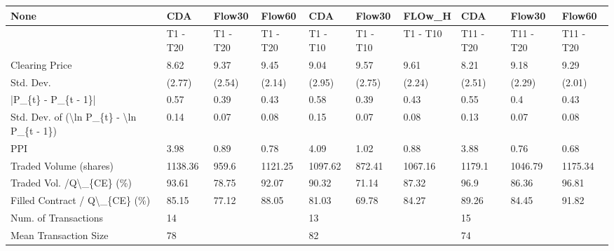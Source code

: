 \begin{tabular}{llllllllll}
\hline
 None                                                      & CDA      & Flow30   & Flow60   & CDA      & Flow30   & FLOw\_H   & CDA       & Flow30    & Flow60    \\
\hline
                                                           & T1 - T20 & T1 - T20 & T1 - T20 & T1 - T10 & T1 - T10 & T1 - T10 & T11 - T20 & T11 - T20 & T11 - T20 \\
 Clearing Price                                            & 8.62     & 9.37     & 9.45     & 9.04     & 9.57     & 9.61     & 8.21      & 9.18      & 9.29      \\
 Std. Dev.                                                 & (2.77)   & (2.54)   & (2.14)   & (2.95)   & (2.75)   & (2.24)   & (2.51)    & (2.29)    & (2.01)    \\
 |P\_\{t\} - P\_\{t - 1\}|                                       & 0.57     & 0.39     & 0.43     & 0.58     & 0.39     & 0.43     & 0.55      & 0.4       & 0.43      \\
 Std. Dev. of (\textbackslash{}ln P\_\{t\} - \textbackslash{}ln P\_\{t - 1\})                  & 0.14     & 0.07     & 0.08     & 0.15     & 0.07     & 0.08     & 0.13      & 0.07      & 0.08      \\
 PPI                                                       & 3.98     & 0.89     & 0.78     & 4.09     & 1.02     & 0.88     & 3.88      & 0.76      & 0.68      \\
 Traded Volume (shares)                                    & 1138.36  & 959.6    & 1121.25  & 1097.62  & 872.41   & 1067.16  & 1179.1    & 1046.79   & 1175.34   \\
 Traded Vol. /Q\textbackslash{}\_\{CE\} (\%)                                  & 93.61    & 78.75    & 92.07    & 90.32    & 71.14    & 87.32    & 96.9      & 86.36     & 96.81     \\
 Filled Contract / Q\textbackslash{}\_\{CE\} (\%)                             & 85.15    & 77.12    & 88.05    & 81.03    & 69.78    & 84.27    & 89.26     & 84.45     & 91.82     \\
 Num. of Transactions                                      & 14       &          &          & 13       &          &          & 15        &           &           \\
 Mean Transaction Size                                     & 78       &          &          & 82       &          &          & 74        &           &           \\

\end{tabular}
